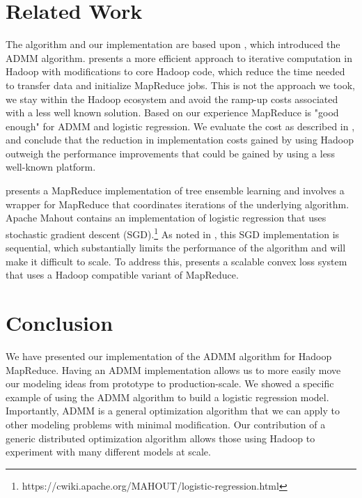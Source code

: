 \documentclass[10pt, conference, compsocconf]{IEEEtran}
\begin{document}
\section{Related Work}\label{sec:related}
The algorithm and our implementation are based upon \cite{boyd}, which introduced the ADMM algorithm.  \cite{bu2010} presents a more efficient approach to iterative computation in Hadoop with modifications to core Hadoop code, which reduce the time needed to transfer data and initialize MapReduce jobs.  This is not the approach we took, we stay within the Hadoop ecosystem and avoid the ramp-up costs associated with a less well known solution.  Based on our experience MapReduce is "good enough" for ADMM and logistic regression.  We evaluate the cost as described in \cite{lin2012}, and conclude that the reduction in implementation costs gained by using Hadoop outweigh the performance improvements that could be gained by using a less well-known platform. 

\cite{planet} presents a MapReduce implementation of tree ensemble learning and involves a wrapper for MapReduce that coordinates iterations of the underlying algorithm.  Apache Mahout contains an implementation of logistic regression that uses stochastic gradient descent (SGD).\footnote{https://cwiki.apache.org/MAHOUT/logistic-regression.html}  As noted in \cite{agarwal2011}, this SGD implementation is sequential, which substantially limits the performance of the algorithm and will make it difficult to scale.  To address this, \cite{agarwal2011} presents a scalable convex loss system that uses a Hadoop compatible variant of MapReduce.

\section{Conclusion}\label{sec:conc}
We have presented our implementation of the ADMM algorithm for Hadoop MapReduce.  Having an ADMM implementation allows us to more easily move our modeling ideas from prototype to production-scale.  We showed a specific example of using the ADMM algorithm to build a logistic regression model.  Importantly, ADMM is a general optimization algorithm that we can apply to other modeling problems with minimal modification.  Our contribution of a generic distributed optimization algorithm allows those using Hadoop to experiment with many different models at scale.


\end{document}
